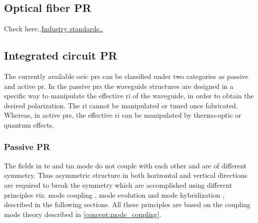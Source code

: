 \documentclass[../report.tex]{subfiles}
\begin{document}
	\subsection{Optical fiber PR}
	Check here..\href{http://www.amstechnologies.com/es/products/optical-technologies/equipment/fiber-optic-test-measurement/measurement-of-fiber-properties/polarisation-mode/view/electrically-driven-polarization-controllers-scramblers/}{Industry standards..}
	
	\subsection{Integrated circuit PR}
The currently available \gls{oeic} \gls{pr}s can be classified under two categories as passive and active \gls{pr}. In the passive \gls{pr}s the waveguide structures are designed in a specific way to manipulate the effective \gls{ri} of the waveguide, in order to obtain the desired polarization. The \gls{ri} cannot be manipulated or tuned once fabricated. Whereas, in active \gls{pr}s, the effective \gls{ri} can be manipulated by thermo-optic or quantum effects.
	
		\subsubsection{Passive PR}
The fields in \gls{te} and \gls{tm} mode do not couple with each other and are of different symmetry. Thus asymmetric structure in both horizontal and vertical directions are required to break the symmetry which are accomplished using different principles viz. mode coupling \cite{dai_novel_2011,ding_Integrated_2013,wang_design_2014}, mode evolution \cite{zhang_selected_2010,chen_compact_2011,zhang_efficient_2012,justin_conference_2012,kazuhiro_integrated_2015} and mode hybridization \cite{fukuda_integrated_2008,leung_numerical_2011,vermeulen_Silicon_2012,velasco_ultracompact_2012}, described in the following sections. All these principles are based on the coupling mode theory described in \ref{concept:mode_coupling}.
			
\end{document}
